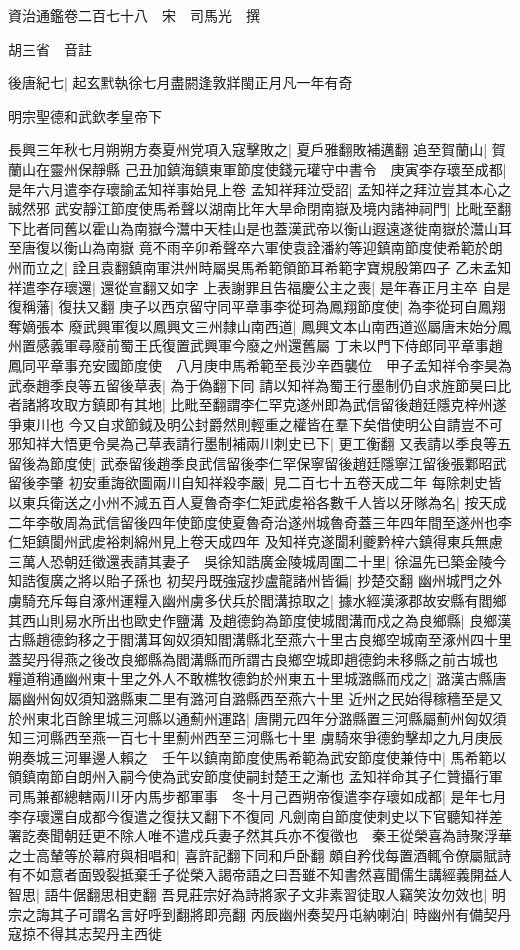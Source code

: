 資治通鑑卷二百七十八　宋　司馬光　撰

胡三省　音註

後唐紀七|{
	起玄黓執徐七月盡閼逢敦牂閩正月凡一年有奇}


明宗聖德和武欽孝皇帝下

長興三年秋七月朔朔方奏夏州党項入寇擊敗之|{
	夏戶雅翻敗補邁翻}
追至賀蘭山|{
	賀蘭山在靈州保靜縣}
己丑加鎮海鎮東軍節度使錢元瓘守中書令　庚寅李存瓌至成都|{
	是年六月遣李存瓌諭孟知祥事始見上卷}
孟知祥拜泣受詔|{
	孟知祥之拜泣豈其本心之誠然邪}
武安靜江節度使馬希聲以湖南比年大旱命閉南嶽及境内諸神祠門|{
	比毗至翻下比者同舊以霍山為南嶽今灊中天桂山是也蓋漢武帝以衡山遐遠遂徙南嶽於灊山耳至唐復以衡山為南嶽}
竟不雨辛卯希聲卒六軍使袁詮潘約等迎鎮南節度使希範於朗州而立之|{
	詮且袁翻鎮南軍洪州時屬吳馬希範領節耳希範字寶規殷第四子}
乙未孟知祥遣李存瓌還|{
	還從宣翻又如字}
上表謝罪且告福慶公主之喪|{
	是年春正月主卒}
自是復稱藩|{
	復扶又翻}
庚子以西京留守同平章事李從珂為鳳翔節度使|{
	為李從珂自鳳翔奪嫡張本}
廢武興軍復以鳳興文三州隸山南西道|{
	鳳興文本山南西道巡屬唐末始分鳳州置感義軍尋廢前蜀王氏復置武興軍今廢之州還舊屬}
丁未以門下侍郎同平章事趙鳳同平章事充安國節度使　八月庚申馬希範至長沙辛酉襲位　甲子孟知祥令李昊為武泰趙季良等五留後草表|{
	為于偽翻下同}
請以知祥為蜀王行墨制仍自求旌節昊曰比者諸將攻取方鎮即有其地|{
	比毗至翻謂李仁罕克遂州即為武信留後趙廷隱克梓州遂爭東川也}
今又自求節鉞及明公封爵然則輕重之權皆在羣下矣借使明公自請豈不可邪知祥大悟更令昊為己草表請行墨制補兩川刺史已下|{
	更工衡翻}
又表請以季良等五留後為節度使|{
	武泰留後趙季良武信留後李仁罕保寧留後趙廷隱寧江留後張鄴昭武留後李肇}
初安重誨欲圖兩川自知祥殺李嚴|{
	見二百七十五卷天成二年}
每除刺史皆以東兵衛送之小州不減五百人夏魯奇李仁矩武䖍裕各數千人皆以牙隊為名|{
	按天成二年李敬周為武信留後四年使節度使夏魯奇治遂州城魯奇蓋三年四年間至遂州也李仁矩鎮閬州武䖍裕刺綿州見上卷天成四年}
及知祥克遂閬利夔黔梓六鎮得東兵無慮三萬人恐朝廷徵還表請其妻子　吳徐知誥廣金陵城周圍二十里|{
	徐温先已築金陵今知誥復廣之將以貽子孫也}
初契丹既強寇抄盧龍諸州皆徧|{
	抄楚交翻}
幽州城門之外虜騎充斥每自涿州運糧入幽州虜多伏兵於閻溝掠取之|{
	據水經漢涿郡故安縣有閻鄉其西山則易水所出也歐史作鹽溝}
及趙德鈞為節度使城閻溝而戍之為良鄉縣|{
	良鄉漢古縣趙德鈞移之于閻溝耳匈奴須知閻溝縣北至燕六十里古良鄉空城南至涿州四十里蓋契丹得燕之後改良鄉縣為閻溝縣而所謂古良鄉空城即趙德鈞未移縣之前古城也}
糧道稍通幽州東十里之外人不敢樵牧德鈞於州東五十里城潞縣而戍之|{
	潞漢古縣唐屬幽州匈奴須知潞縣東二里有潞河自潞縣西至燕六十里}
近州之民始得稼穡至是又於州東北百餘里城三河縣以通薊州運路|{
	唐開元四年分潞縣置三河縣屬薊州匈奴須知三河縣西至燕一百七十里薊州西至三河縣七十里}
虜騎來爭德鈞擊却之九月庚辰朔奏城三河畢邊人賴之　壬午以鎮南節度使馬希範為武安節度使兼侍中|{
	馬希範以領鎮南節自朗州入嗣今使為武安節度使嗣封楚王之漸也}
孟知祥命其子仁贊攝行軍司馬兼都總轄兩川牙内馬步都軍事　冬十月己酉朔帝復遣李存瓌如成都|{
	是年七月李存瓌還自成都今復遣之復扶又翻下不復同}
凡劍南自節度使刺史以下官聽知祥差署訖奏聞朝廷更不除人唯不遣戍兵妻子然其兵亦不復徵也　秦王從榮喜為詩聚浮華之士高輦等於幕府與相唱和|{
	喜許記翻下同和戶卧翻}
頗自矜伐每置酒輒令僚屬賦詩有不如意者面毁裂抵棄壬子從榮入謁帝語之曰吾雖不知書然喜聞儒生講經義開益人智思|{
	語牛倨翻思相吏翻}
吾見莊宗好為詩將家子文非素習徒取人竊笑汝勿效也|{
	明宗之誨其子可謂名言好呼到翻將即亮翻}
丙辰幽州奏契丹屯納喇泊|{
	時幽州有備契丹寇掠不得其志契丹主西徙}


